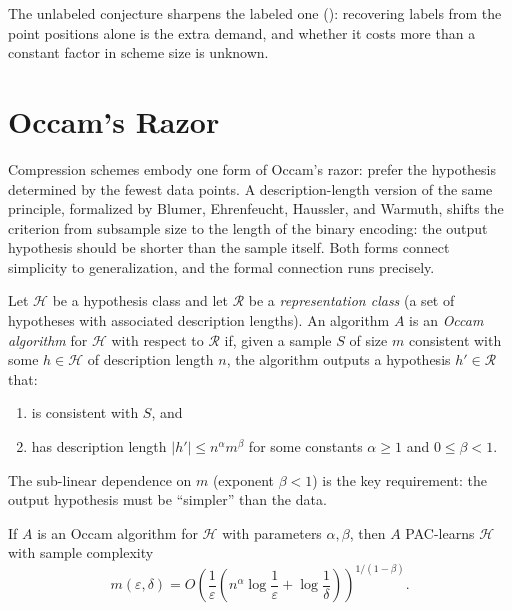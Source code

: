 \begin{remark}
The unlabeled conjecture sharpens the labeled one ():
recovering labels from the point positions alone is the extra demand, and
whether it costs more than a constant factor in scheme size is unknown.
\end{remark}



\section{Occam's Razor}
\label{sec:occam}

Compression schemes embody one form of Occam's razor: prefer the hypothesis
determined by the fewest data points.  A description-length version of the same
principle, formalized by Blumer, Ehrenfeucht, Haussler, and Warmuth, shifts the
criterion from subsample size to the length of the binary encoding: the output
hypothesis should be shorter than the sample itself.  Both forms connect
simplicity to generalization, and the formal connection runs precisely.

\begin{defn}
\label{def:occam}
Let $\mathcal{H}$ be a hypothesis class and let $\mathcal{R}$ be a
\emph{representation class} (a set of hypotheses with associated description
lengths).  An algorithm $A$ is an \emph{Occam algorithm} for $\mathcal{H}$ with
respect to $\mathcal{R}$ if, given a sample $S$ of size $m$ consistent with some
$h \in \mathcal{H}$ of description length $n$, the algorithm outputs a
hypothesis $h' \in \mathcal{R}$ that:
\begin{enumerate}[leftmargin=*, nosep]
\item is consistent with $S$, and
\item has description length $|h'| \leq n^\alpha m^\beta$ for some constants
  $\alpha \geq 1$ and $0 \leq \beta < 1$.
\end{enumerate}
The sub-linear dependence on $m$ (exponent $\beta < 1$) is the key requirement:
the output hypothesis must be ``simpler'' than the data.
\end{defn}

\begin{thm}
\label{thm:occam}
If $A$ is an Occam algorithm for $\mathcal{H}$ with parameters $\alpha, \beta$,
then $A$ PAC-learns $\mathcal{H}$ with sample complexity
\[
  m(\varepsilon, \delta) = O\!\left(\frac{1}{\varepsilon}\left(
    n^\alpha \log\frac{1}{\varepsilon}
    + \log\frac{1}{\delta}\right)\right)^{1/(1-\beta)}.
\]
\end{thm}

